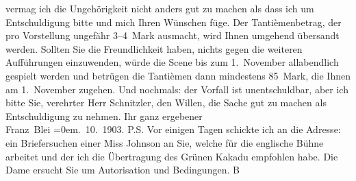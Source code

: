 \begin{ledgroupsized}[t]{13cm}
               vermag ich die Ungehörigkeit {\pb}nicht anders gut zu machen als
               dass ich um Entschuldigung bitte und mich Ihren Wünschen füge. Der Tantièmenbetrag,
               der pro Vorstellung ungefähr 3–4 Mark ausmacht, wird Ihnen umgehend übersandt werden.
               Sollten Sie die Freundlichkeit \introOben{}haben\introOben{}, nichts gegen die
               weiteren Aufführungen einzuwenden, würde die Scene bis zum 1. November allabendlich
               gespielt werden und betrügen die Tantièmen dann mindestens 85 Mark, die Ihnen am
                  1. November zugehen.\pend
           \pstart
           Und nochmals: der Vorfall ist unentschuldbar, aber ich bitte Sie, verehrter Herr
               Schnitzler, den Willen, die Sache gut zu machen als Entschuldigung zu nehmen.\pend
           \pstart
           Ihr ganz ergebener{\\[\baselineskip]}\spacefill\mbox{Franz Blei}\pend
           \leftskip=0em{}. 10. 1903.\pend
           \pstart
           P.S. Vor einigen Tagen schickte ich an die Adresse: \label{K_L01329_1v}\label{K_L01329_1h} ein Briefersuchen einer
                  Miss Johnson an Sie, welche für die englische Bühne arbeitet und der ich die
                  Übertragung des {\pb}Grünen Kakadu empfohlen habe. Die Dame ersucht
                  Sie um Autorisation und Bedingungen. \spacefill\mbox{B}\pend
                     \endnumbering{}\end{ledgroupsized}  \newcommand{\dateiname}{L01329}\newcommand{\titel}{Franz Blei an Arthur Schnitzler, 17. 10. 1903}\newcommand{\editorInnen}{Martin Anton Müller und Gerd-Hermann Susen}
            \footnotesize
\begin{ledgroupsized}[t]{11.5cm}
\end{ledgroupsized}
         
      